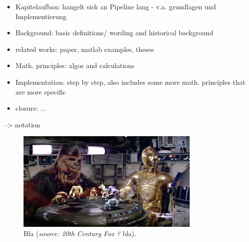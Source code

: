 

\begin{itemize}
\item Kapitelaufbau: hangelt sich an Pipeline lang - v.a. grundlagen und Implementierung
\item Background: basic definitions/ wording and historical background
\item related works: paper, matlab examples, theses
\item Math. principles: algos and calculations
\item Implementation: step by step, also includes some more math. principles that are more specific
\item closure: ...
\end{itemize}

--> notation


\begin{figure}[htbp]
		\centering
		\includegraphics[width=0.8\textwidth]{figures/starWars}
		\caption[Bla]{Bla (\textit{source: 20th Century Fox ?} bla).}
		\label{fig:3dVisionary}
\end{figure}

